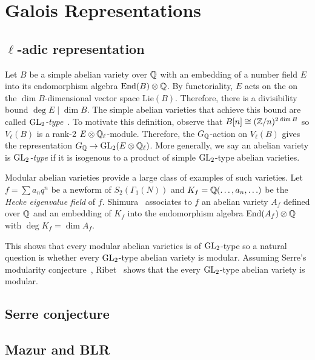 \documentclass[11pt, proquest]{uwthesis}
\begin{document}
\section{Galois Representations} 

\subsection{$\ell$-adic representation}%
\label{sub:_ell_adic_representation}

Let $B$ be a simple abelian variety over $\mathbb{Q}$ with an embedding of a number
field $E$ into its endomorphism algebra $\operatorname{End}(B)\otimes \mathbb{Q}$. By functoriality,
$E$ acts on the on the $\dim B$-dimensional vector space $\mathrm{Lie}(B)$.
Therefore, there is a divisibility bound $\deg E\mid \dim B$. The simple
abelian varieties that achieve this bound are called
\emph{$\operatorname{GL}_2$-type}~\cite[\S 2]{ribet:abvars}. To motivate this definition,
observe that $B[n]\cong (\mathbb{Z}/n)^{2\dim B}$ so $V_\ell(B)$ is a rank-2 $E\otimes
\mathbb{Q}_\ell$-module. Therefore, the $G_{\mathbb{Q}}$-action on $V_\ell(B)$ gives the
representation $G_{\mathbb{Q}}\to \operatorname{GL}_2(E\otimes \mathbb{Q}_\ell)$. More generally, we say an
abelian variety is \emph{$\operatorname{GL}_2$-type} if it is isogenous to a product of
simple $\operatorname{GL}_2$-type abelian varieties.

Modular abelian varieties provide a large class of examples of such varieties.
Let $f=\sum a_n q^n$ be a newform of $S_2(\Gamma_1(N))$ and
$K_f=\mathbb{Q}(\ldots,a_n,\ldots)$ be the \emph{Hecke eigenvalue field} of $f$.
Shimura~\cite[Theorem 7.14]{shimura:intro} associates to $f$ an abelian variety
$A_f$ defined over $\mathbb{Q}$ and an embedding of $K_f$ into the endomorphism
algebra $\operatorname{End}(A_f)\otimes \mathbb{Q}$ with $\deg K_f = \dim A_f$. 

This shows that every modular abelian varieties is of $\operatorname{GL}_2$-type so a natural
question is whether every $\operatorname{GL}_2$-type abelian variety is modular. Assuming Serre's
modularity conjecture~\cite[3.2.4]{serre:conjectures}, Ribet~\cite[Thm.
4.4]{ribet:abvars} shows that the every $\operatorname{GL}_2$-type abelian variety is
modular.

\subsection{Serre conjecture}%
\label{sub:serre_conjecture}

\subsection{Mazur and BLR}%
\label{sub:mazur_and_blr} 
\end{document}
